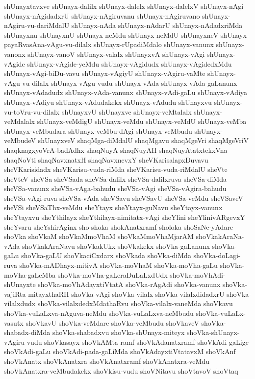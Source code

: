 {shUnayxtavxve
shUnayx-dalilx
shUnayx-dalelx
shUnayx-dalelxV
shUnayx-nAgi
shUnayx-nAgidadxrU
shUnayx-nAgiruvanu
shUnayx-nAgiruvano
shUnayx-nAgiru-vu-dariMdalU
shUnayx-nAda
shUnayx-nAdarU
shUnayx-nAdadxriMda
shUnayxnu
shUnayxnU
shUnayx-neMdu
shUnayx-neMdU
shUnayxneV
shUnayx-payaRvasAna-vAgu-vu-dilalx
shUnayx-rUpadiMdalo
shUnayx-vanunx
shUnayx-vanonx
shUnayx-vanoV
shUnayx-valalx
shUnayxvA
shUnayx-vAgi
shUnayx-vAgide
shUnayx-vAgide-yeMdu
shUnayx-vAgidudx
shUnayx-vAgidedxMdu
shUnayx-vAgi-biDu-vavu
shUnayx-vAgiyU
shUnayx-vAgiru-vaMte
shUnayx-vAgu-vu-dilalx
shUnayx-vAgu-vudu
shUnayx-vAda
shUnayx-vAda-gaLanunx
shUnayx-vAdadudx
shUnayx-vAda-vanunx
shUnayx-vAdi-gaLu
shUnayx-vAdiya
shUnayx-vAdiyu
shUnayx-vAdudakekx
shUnayx-vAdudu
shUnayxvu
shUnayx-vu-toVru-vu-dilalx
shUnayxvU
shUnayxve
shUnayx-veMtalalx
shUnayx-veMdalalx
shUnayx-veMdigU
shUnayx-veMdu
shUnayx-veMdU
shUnayx-veMba
shUnayx-veMbudara
shUnayx-veMbu-dAgi
shUnayx-veMbudu
shUnayx-veMbudeV
shUnayxveV
shaqMga-diMdalU
shaqMgavu
shaqMgeVri
shaqMgeVriV
shaqknagxyoVrA-badAdhx
shaqNuyA
shaqNuyAH
shaqNuyAtatxtekxVna
shaqNoVti
shaqNavxnatxH
shaqNavxnevxY
sheVKarisalapxDuvavu
sheVKarisidadx
sheVKarisu-vuda-riMda
sheVKarisu-vuda-riMdalU
sheVte
sheVteV
sheVSa
sheVSada
sheVSa-dalilx
sheVSa-dalilxruva
sheVSa-diMda
sheVSa-vanunx
sheVSa-vAga-bahudu
sheVSa-vAgi
sheVSa-vAgira-bahudu
sheVSa-vAgi-ruva
sheVSa-vAda
sheVSavu
sheVSavU
sheVSa-veMdu
sheVSaveV
sheVSi
sheVSaThx-veMdu
sheYtayx
sheYtayx-guNavu
sheYtayx-vanunx
sheYtayxvu
sheYthilayx
sheYthilayx-nimitatx-vAgi
sheYlini
sheYlinivARgevxY
sheYvaru
sheYshirAginx
sho
shoka
shokAnatxramf
sholoka
shoSaNe-yAdare
shoVka
shoVkaM
shoVkaMmoVhaM
shoVkaMmoVhaMjarAM
shoVkakAraNa-vAda
shoVkakAraNavu
shoVkakUkx
shoVkakekx
shoVka-gaLanunx
shoVka-gaLu
shoVka-gaLU
shoVkaciCxdarx
shoVkada
shoVka-diMda
shoVka-doLagi-ruva
shoVka-mADhayx-mitivA
shoVka-moVhaM
shoVka-moVha-gaLu
shoVka-moVha-gaLeMba
shoVka-moVha-gaLeraDuLaLxdUdx
shoVka-moVhAdi-shUnayxte
shoVka-moVhAdayxtiVtatA
shoVka-rAgAdi
shoVka-vanunx
shoVka-vajiRta-mitayxthaRH
shoVka-vAgi
shoVka-vilalx
shoVka-vilalxdidadxrU
shoVka-vilalxdudx
shoVka-vilalxdedxMdathaRvu
shoVka-vilalx-vaneMda
shoVkavu
shoVka-vuLaLxva-nAguva-neMdu
shoVka-vuLaLxva-neMbudu
shoVka-vuLaLx-vasutx
shoVkavU
shoVka-veMdare
shoVka-veMbudu
shoVkaveV
shoVka-shabadx-diMda
shoVka-shabadxvu
shoVka-shUnayx-miteyx
shoVka-shUnayx-vAgiru-vudu
shoVkasayx
shoVkAMta-ramf
shoVkAdanatxramf
shoVkAdi-gaLige
shoVkAdi-gaLu
shoVkAdi-pada-gaLiMda
shoVkAdayxtiVtatavxM
shoVkAnf
shoVkAnatx
shoVkAnatxra
shoVkAnatxramf
shoVkAnatxra-veMdu
shoVkAnatxra-veMbudakekx
shoVkisu-vudu
shoVNitavu
shoVtavoV
shoVtaq
}
